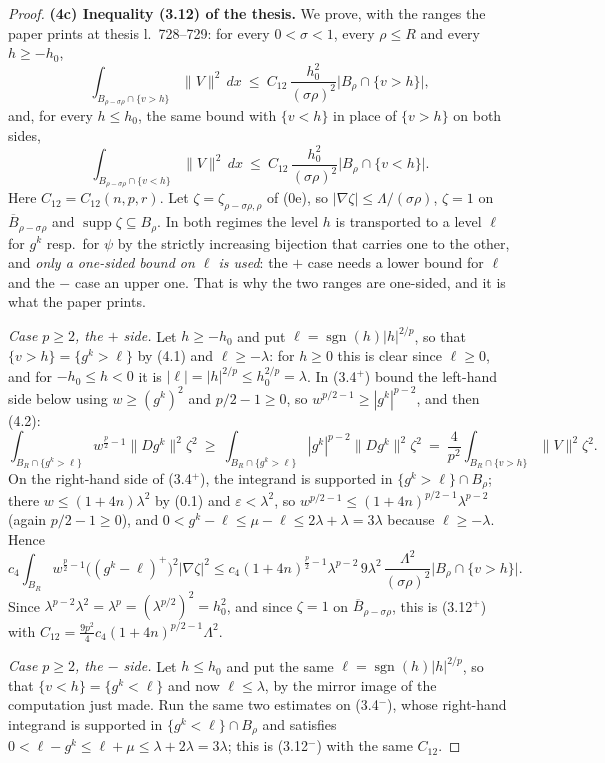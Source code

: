 \begin{proof}
\textbf{(4c) Inequality (3.12) of the thesis.}  We prove, with the ranges the paper
prints at thesis l.~728--729: for every $0<\sigma<1$, every $\rho\le R$ and
every $h\ge-h_0$,
\[
\int_{B_{\rho-\sigma\rho}\cap\{v>h\}}\|V\|^2\,dx
\ \le\ C_{12}\,\frac{h_0^2}{(\sigma\rho)^2}\bigl|B_\rho\cap\{v>h\}\bigr| ,
\tag{3.12$^+$}
\]
and, for every $h\le h_0$, the same bound with $\{v<h\}$ in place of
$\{v>h\}$ on both sides,
\[
\int_{B_{\rho-\sigma\rho}\cap\{v<h\}}\|V\|^2\,dx
\ \le\ C_{12}\,\frac{h_0^2}{(\sigma\rho)^2}\bigl|B_\rho\cap\{v<h\}\bigr| .
\tag{3.12$^-$}
\]
Here $C_{12}=C_{12}(n,p,r)$.  Let $\zeta=\zeta_{\rho-\sigma\rho,\rho}$ of (0e),
so $|\nabla\zeta|\le\Lambda/(\sigma\rho)$, $\zeta=1$ on
$\overline B_{\rho-\sigma\rho}$ and $\operatorname{supp}\zeta\subseteq B_\rho$.
In both regimes the level $h$ is transported to a level $\ell$ for $g^k$ resp.\
for $\psi$ by the strictly increasing bijection that carries one to the other,
and \emph{only a one-sided bound on $\ell$ is used}: the $+$ case needs a lower
bound for $\ell$ and the $-$ case an upper one.  That is why the two ranges are
one-sided, and it is what the paper prints.

\emph{Case $p\ge2$, the $+$ side.}  Let $h\ge-h_0$ and put
$\ell=\operatorname{sgn}(h)|h|^{2/p}$, so that $\{v>h\}=\{g^k>\ell\}$ by (4.1)
and $\ell\ge-\lambda$: for $h\ge0$ this is clear since $\ell\ge0$, and for
$-h_0\le h<0$ it is $|\ell|=|h|^{2/p}\le h_0^{2/p}=\lambda$.  In (3.4$^+$) bound
the left-hand side below using $w\ge(g^k)^2$ and $p/2-1\ge0$, so
$w^{p/2-1}\ge|g^k|^{p-2}$, and then (4.2):
\[
\int_{B_R\cap\{g^k>\ell\}}w^{\frac p2-1}\|Dg^k\|^2\zeta^2
\ \ge\ \int_{B_R\cap\{g^k>\ell\}}|g^k|^{p-2}\|Dg^k\|^2\zeta^2
\ =\ \frac4{p^2}\int_{B_R\cap\{v>h\}}\|V\|^2\zeta^2 .
\]
On the right-hand side of (3.4$^+$), the integrand is supported in
$\{g^k>\ell\}\cap B_\rho$; there $w\le(1+4n)\lambda^2$ by (0.1) and
$\varepsilon<\lambda^2$, so $w^{p/2-1}\le(1+4n)^{p/2-1}\lambda^{p-2}$ (again
$p/2-1\ge0$), and $0<g^k-\ell\le\mu-\ell\le2\lambda+\lambda=3\lambda$ because
$\ell\ge-\lambda$.  Hence
\[
c_4\int_{B_R}w^{\frac p2-1}\bigl((g^k-\ell)^+\bigr)^2|\nabla\zeta|^2
\le c_4(1+4n)^{\frac p2-1}\lambda^{p-2}\,9\lambda^2\,
\frac{\Lambda^2}{(\sigma\rho)^2}\bigl|B_\rho\cap\{v>h\}\bigr| .
\]
Since $\lambda^{p-2}\lambda^2=\lambda^p=(\lambda^{p/2})^2=h_0^2$, and since
$\zeta=1$ on $\overline B_{\rho-\sigma\rho}$, this is (3.12$^+$) with
$C_{12}=\tfrac{9p^2}4c_4(1+4n)^{p/2-1}\Lambda^2$.

\emph{Case $p\ge2$, the $-$ side.}  Let $h\le h_0$ and put the same
$\ell=\operatorname{sgn}(h)|h|^{2/p}$, so that $\{v<h\}=\{g^k<\ell\}$ and now
$\ell\le\lambda$, by the mirror image of the computation just made.  Run the
same two estimates on (3.4$^-$), whose right-hand integrand is supported in
$\{g^k<\ell\}\cap B_\rho$ and satisfies
$0<\ell-g^k\le\ell+\mu\le\lambda+2\lambda=3\lambda$; this is (3.12$^-$) with the
same $C_{12}$.


\end{proof}
